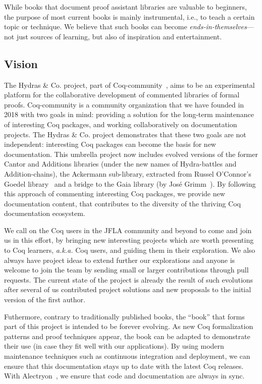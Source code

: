 \documentclass{easychair}
\newcommand{\coq}{Coq\xspace}
\newcommand{\community}{Coq-community\xspace}
\newcommand{\gaia}{Gaia\xspace}
\newcommand{\alectr}{Alectryon\xspace}
\newcommand{\Hydras}{Hydras \& Co.\xspace}
\begin{document}
While books that document proof assistant libraries are valuable to beginners, the purpose of most current books is mainly instrumental, i.e., to teach a certain topic or technique. We believe that such books can become \emph{ends-in-themselves}---not just sources of learning, but also of inspiration and entertainment.

\subsection{Vision}
The \Hydras project, part of \community~\cite{CoqCommunity}, aims to be an experimental platform for the collaborative development of commented libraries of formal proofs. \community is a community organization that we have founded in 2018 with two goals in mind: providing a solution for the long-term maintenance of interesting \coq packages, and working collaboratively on documentation projects. The \Hydras project demonstrates that these two goals are not independent: interesting \coq packages can become the basis for new documentation.
%
This umbrella project now includes evolved versions of the former Cantor and Additions libraries (under the new names of Hydra-battles and Addition-chains), the Ackermann sub-library, extracted from Russel O'Connor's Goedel library~\cite{OConnor05, Goedel} and a bridge to the \gaia library (by José Grimm~\cite{Gaia,grimm:hal-00911710}).
%
By following this approach of commenting interesting \coq packages, we provide new documentation content, that contributes to the diversity of the thriving \coq documentation ecosystem.

We call on the \coq users in the JFLA community and beyond to come and join us in this effort, by bringing new interesting projects which are worth presenting to \coq learners, \emph{a.k.a.} \coq users, and guiding them in their exploration.
%
We also always have project ideas to extend further our explorations and anyone is welcome to join the team by sending small or larger contributions through pull requests.
%
The current state of the project is already the result of such evolutions after several of us contributed project solutions and new proposals to the initial version of the first author.

Futhermore, contrary to traditionally published books, the ``book'' that forms part of this project is intended to be forever evolving. As new \coq formalization patterns and proof techniques appear, the book can be adapted to demonstrate their use (in case they fit well with our applications).
%
By using modern maintenance techniques such as continuous integration and deployment, we can ensure that this documentation stays up to date with the latest \coq releases. With \alectr~\cite{alectryonpaper, alectryongithub}, we ensure that code and documentation are always in sync.
\end{document}
